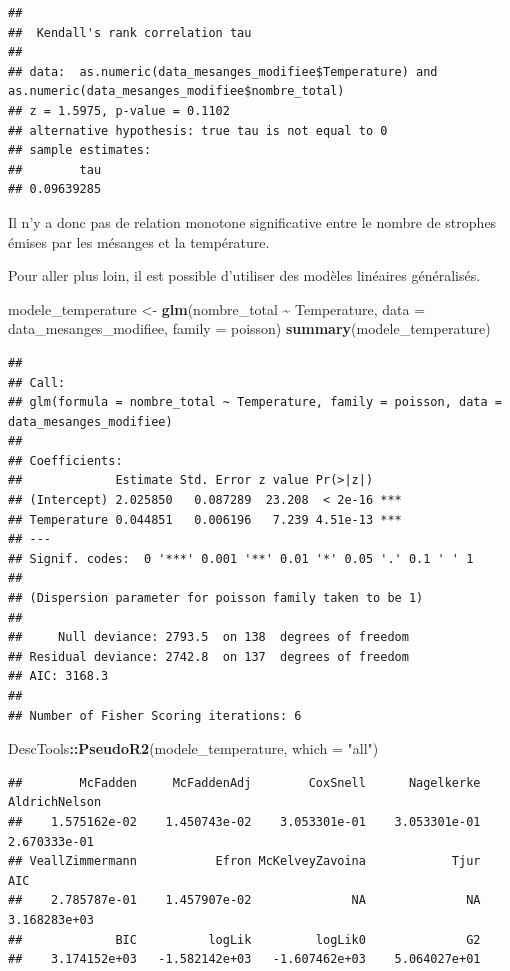 \documentclass[
  french,
]{article}
\newenvironment{Shaded}{\begin{snugshade}}{\end{snugshade}}
\newcommand{\AttributeTok}[1]{\textcolor[rgb]{0.13,0.29,0.53}{#1}}
\newcommand{\FunctionTok}[1]{\textcolor[rgb]{0.13,0.29,0.53}{\textbf{#1}}}
\newcommand{\NormalTok}[1]{#1}
\newcommand{\OtherTok}[1]{\textcolor[rgb]{0.56,0.35,0.01}{#1}}
\newcommand{\SpecialCharTok}[1]{\textcolor[rgb]{0.81,0.36,0.00}{\textbf{#1}}}
\newcommand{\StringTok}[1]{\textcolor[rgb]{0.31,0.60,0.02}{#1}}
\begin{document}
\begin{verbatim}
## 
##  Kendall's rank correlation tau
## 
## data:  as.numeric(data_mesanges_modifiee$Temperature) and as.numeric(data_mesanges_modifiee$nombre_total)
## z = 1.5975, p-value = 0.1102
## alternative hypothesis: true tau is not equal to 0
## sample estimates:
##        tau 
## 0.09639285
\end{verbatim}

Il n'y a donc pas de relation monotone significative entre le nombre de
strophes émises par les mésanges et la température.

Pour aller plus loin, il est possible d'utiliser des modèles linéaires
généralisés.

\begin{Shaded}
\begin{Highlighting}[]
\NormalTok{modele\_temperature }\OtherTok{\textless{}{-}} \FunctionTok{glm}\NormalTok{(nombre\_total }\SpecialCharTok{\textasciitilde{}}\NormalTok{ Temperature, }\AttributeTok{data =}\NormalTok{ data\_mesanges\_modifiee, }\AttributeTok{family =}\NormalTok{ poisson)}
\FunctionTok{summary}\NormalTok{(modele\_temperature)}
\end{Highlighting}
\end{Shaded}

\begin{verbatim}
## 
## Call:
## glm(formula = nombre_total ~ Temperature, family = poisson, data = data_mesanges_modifiee)
## 
## Coefficients:
##             Estimate Std. Error z value Pr(>|z|)    
## (Intercept) 2.025850   0.087289  23.208  < 2e-16 ***
## Temperature 0.044851   0.006196   7.239 4.51e-13 ***
## ---
## Signif. codes:  0 '***' 0.001 '**' 0.01 '*' 0.05 '.' 0.1 ' ' 1
## 
## (Dispersion parameter for poisson family taken to be 1)
## 
##     Null deviance: 2793.5  on 138  degrees of freedom
## Residual deviance: 2742.8  on 137  degrees of freedom
## AIC: 3168.3
## 
## Number of Fisher Scoring iterations: 6
\end{verbatim}

\begin{Shaded}
\begin{Highlighting}[]
\NormalTok{DescTools}\SpecialCharTok{::}\FunctionTok{PseudoR2}\NormalTok{(modele\_temperature, }\AttributeTok{which =} \StringTok{"all"}\NormalTok{)}
\end{Highlighting}
\end{Shaded}

\begin{verbatim}
##        McFadden     McFaddenAdj        CoxSnell      Nagelkerke   AldrichNelson 
##    1.575162e-02    1.450743e-02    3.053301e-01    3.053301e-01    2.670333e-01 
## VeallZimmermann           Efron McKelveyZavoina            Tjur             AIC 
##    2.785787e-01    1.457907e-02              NA              NA    3.168283e+03 
##             BIC          logLik         logLik0              G2 
##    3.174152e+03   -1.582142e+03   -1.607462e+03    5.064027e+01
\end{verbatim}
\end{document}
